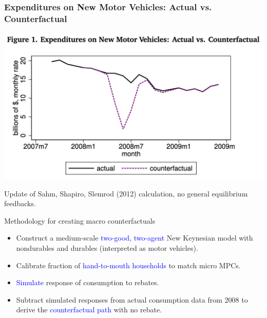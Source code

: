 \documentclass[english,xcolor=svgnames]{beamer}
\begin{document}
\begin{frame}{}
\frametitle{Expenditures on New Motor Vehicles: Actual vs. Counterfactual}

\begin{center}
	\includegraphics[scale=0.4]{figures/ORWFIG1.png}
 \end{center} 
{\footnotesize Update of Sahm, Shapiro, Slemrod (2012) calculation, no general equilibrium feedbacks.}
\end{frame}

\begin{frame}{Methodology for creating macro counterfactuals}
\vspace{.1in}

  \begin{itemize}\itemsep=4ex
  \item Construct a medium-scale \textcolor{blue}{two-good, two-agent} New Keynesian model with nondurables and durables (interpreted as motor vehicles).
  \item Calibrate fraction of \textcolor{blue}{hand-to-mouth households} to match micro MPCs.
  \item \textcolor{blue}{Simulate} response of consumption to rebates.
  \item Subtract simulated responses from actual consumption data  from 2008 to derive the \textcolor{blue}{counterfactual path} with no rebate.
  \end{itemize}
\end{frame}
\end{document}
